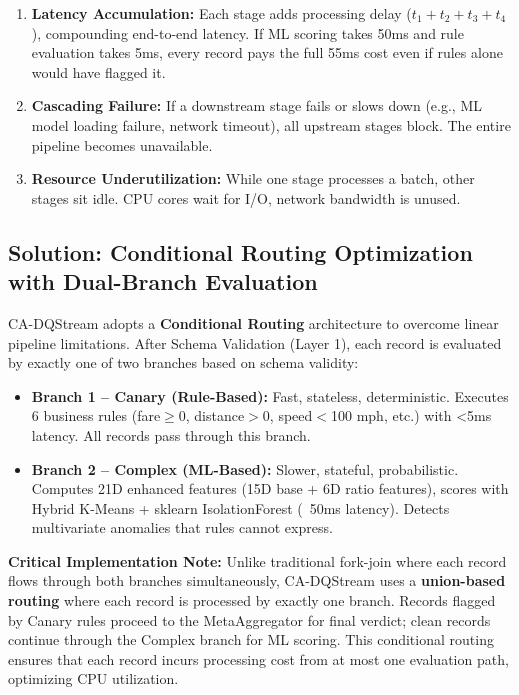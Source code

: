 \begin{enumerate}
    \item \textbf{Latency Accumulation:} Each stage adds processing delay ($t_1 + t_2 + t_3 + t_4$), compounding end-to-end latency. If ML scoring takes 50ms and rule evaluation takes 5ms, every record pays the full 55ms cost even if rules alone would have flagged it.

    \item \textbf{Cascading Failure:} If a downstream stage fails or slows down (e.g., ML model loading failure, network timeout), all upstream stages block. The entire pipeline becomes unavailable.

    \item \textbf{Resource Underutilization:} While one stage processes a batch, other stages sit idle. CPU cores wait for I/O, network bandwidth is unused.
\end{enumerate}

\subsection{Solution: Conditional Routing Optimization with Dual-Branch Evaluation}

CA-DQStream adopts a \textbf{Conditional Routing} architecture to overcome linear pipeline limitations. After Schema Validation (Layer 1), each record is evaluated by exactly one of two branches based on schema validity:

\begin{itemize}
    \item \textbf{Branch 1 -- Canary (Rule-Based):} Fast, stateless, deterministic. Executes 6 business rules (fare$\geq$0, distance$>$0, speed$<$100 mph, etc.) with <5ms latency. All records pass through this branch.

    \item \textbf{Branch 2 -- Complex (ML-Based):} Slower, stateful, probabilistic. Computes 21D enhanced features (15D base + 6D ratio features), scores with Hybrid K-Means + sklearn IsolationForest (~50ms latency). Detects multivariate anomalies that rules cannot express.
\end{itemize}

\textbf{Critical Implementation Note:} Unlike traditional fork-join where each record flows through both branches simultaneously, CA-DQStream uses a \textbf{union-based routing} where each record is processed by exactly one branch. Records flagged by Canary rules proceed to the MetaAggregator for final verdict; clean records continue through the Complex branch for ML scoring. This conditional routing ensures that each record incurs processing cost from at most one evaluation path, optimizing CPU utilization.


